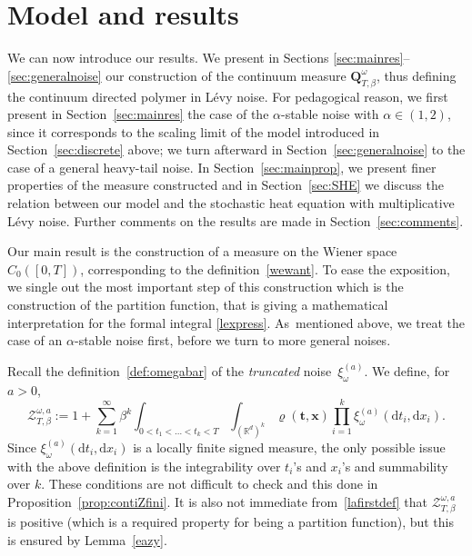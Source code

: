 \documentclass[10pt]{amsart}
\let\mathcal\mathscr
\theoremstyle{definition}
\newcommand{\bt}{\boldsymbol{t}}
\newcommand{\bx}{\boldsymbol{x}}
\newcommand{\dd}{\mathrm{d}}
\newcommand{\cZ}{{\ensuremath{\mathcal Z}} }
\newcommand{\bQ}{{\ensuremath{\mathbf Q}} }
\newcommand{\bbR}{{\ensuremath{\mathbb R}} }
\let\ga\alpha
\let\gb\beta
\let\go\omega
\begin{document}
\section{Model and results}

We can now introduce our results. We present in Sections \ref{sec:mainres}--\ref{sec:generalnoise} our construction of the continuum measure $\bQ_{T,\gb}^{\go}$,
thus defining the continuum directed polymer in Lévy noise.
For pedagogical reason, we first present in Section~\ref{sec:mainres} the case of the $\alpha$-stable noise with $\ga\in (1,2)$, since it corresponds
to the scaling limit of the model introduced in Section~\ref{sec:discrete} above;
we turn afterward in Section~\ref{sec:generalnoise} to the case of a general heavy-tail noise.
In Section~\ref{sec:mainprop},
we present finer properties of the
measure constructed
and
in Section~\ref{sec:SHE} we discuss the
relation between our model
and the stochastic heat equation with multiplicative Lévy noise.
Further comments on the results are
made in Section~\ref{sec:comments}.

\label{sec:mainres}

Our main result is the construction of a measure on the Wiener space $C_0([0,T])$,
corresponding to the definition~\eqref{wewant}.
To ease the exposition, we single out the most important step of this construction which is the construction of the partition function,
that is giving a mathematical interpretation for the formal integral \eqref{lexpress}.
As~mentioned above, we treat the case of an $\alpha$-stable noise first,
before we turn to more general noises.

Recall the definition~\eqref{def:omegabar}
of the \textit{truncated} noise~$\xi_{\go}^{(a)}$.
We define, for $a>0$,
\begin{equation}\label{lafirstdef}
\cZ^{\go,a}_{T,\beta}:=1+\sum_{k=1}^\infty \beta^k\int_{0<t_1<\dots<t_k<T}\int_{(\bbR^d)^k} \varrho(\bt,\bx) \prod_{i=1}^k \xi_{\go}^{(a)} (\dd t_i, \dd x_i).
\end{equation}
Since $\xi_{\go}^{(a)} (\dd t_i, \dd x_i)$ is a locally finite signed measure, the only possible issue with the above definition is the integrability over $t_i$'s and $x_i$'s and summability over $k$. These conditions are not difficult to check and this done in Proposition~\ref{prop:contiZfini}.
It is also not immediate from~\eqref{lafirstdef} that
$\cZ^{\go,a}_{T,\beta}$ is positive (which is a required property for being a partition function), but this is ensured by Lemma~\ref{eazy}.
\end{document}
